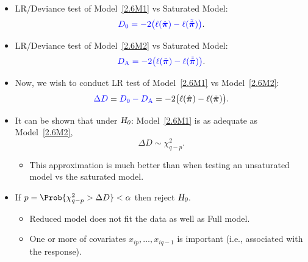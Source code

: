 \documentclass{article}\usepackage[]{graphicx}\usepackage[svgnames]{xcolor}
\newcommand{\HN}{\textsl{H}_{\textsl{0}}}%
\providecommand{\Vector}[1]{\bm{#1}}%
\begin{document}
\begin{itemize}
      \item LR/Deviance test of Model~\ref{2.6M1} vs Saturated Model:
            \[ \textcolor{Blue}{D_0=-2\bigl(\ell(\hat{\Vector{\pi}})-\ell(\tilde{\tilde{\Vector{\pi}}})\bigr)}. \]
      \item LR/Deviance test of Model~\ref{2.6M2} vs Saturated Model:
            \[ \textcolor{Blue}{D_\text{A}=-2\bigl(\ell(\tilde{\Vector{\pi}})-\ell(\tilde{\tilde{\Vector{\pi}}})\bigr)}. \]
      \item Now, we wish to conduct LR test of Model~\ref{2.6M1} vs Model~\ref{2.6M2}:
            \[ \textcolor{Blue}{\Delta D} = \textcolor{Blue}{D_0-D_{\text{A}}}=-2\bigl(\ell(\hat{\Vector{\pi}})-\ell(\tilde{\Vector{\pi}})\bigr). \]
      \item It can be shown that under $ \HN $: Model~\ref{2.6M1} is as adequate as Model~\ref{2.6M2},
            \[ \Delta D \sim \chi^2_{q-p}. \]
            \begin{itemize}
                  \item This approximation is much better than when testing an unsaturated
                        model vs the saturated model.
            \end{itemize}
      \item If $ p=\Prob{\chi^2_{q-p}>\Delta D}<\alpha $ then reject $ \HN $.
            \begin{itemize}
                  \item Reduced model does not fit the data as well as Full model.
                  \item One or more of covariates $ x_{ip},\ldots,x_{iq-1} $ is important (i.e., associated with the response).
            \end{itemize}
\end{itemize}
\end{document}
